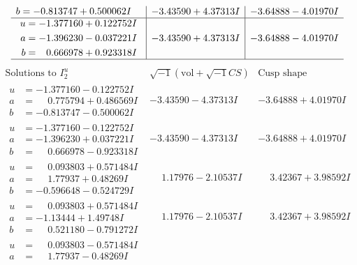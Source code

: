 \documentclass[1p]{elsarticle_modified}
\theoremstyle{definition}
\newcommand{\I}{\sqrt{-1}}
\begin{document}
$$\begin{array}{c|c|c}
\begin{aligned}
b &= -0.813747 + 0.500062 I\end{aligned}
 & -3.43590 + 4.37313 I & -3.64888 - 4.01970 I \\ \hline\begin{aligned}
u &= -1.377160 + 0.122752 I \\
a &= -1.396230 - 0.037221 I \\
b &= \phantom{-}0.666978 + 0.923318 I\end{aligned}
 & -3.43590 + 4.37313 I & -3.64888 - 4.01970 I\\
 \hline 
 \end{array}$$\newpage$$\begin{array}{c|c|c}  
\text{Solutions to }I^u_{2}& \I (\text{vol} + \sqrt{-1}CS) & \text{Cusp shape}\\
 \hline 
\begin{aligned}
u &= -1.377160 - 0.122752 I \\
a &= \phantom{-}0.775794 + 0.486569 I \\
b &= -0.813747 - 0.500062 I\end{aligned}
 & -3.43590 - 4.37313 I & -3.64888 + 4.01970 I \\ \hline\begin{aligned}
u &= -1.377160 - 0.122752 I \\
a &= -1.396230 + 0.037221 I \\
b &= \phantom{-}0.666978 - 0.923318 I\end{aligned}
 & -3.43590 - 4.37313 I & -3.64888 + 4.01970 I \\ \hline\begin{aligned}
u &= \phantom{-}0.093803 + 0.571484 I \\
a &= \phantom{-}1.77937 + 0.48269 I \\
b &= -0.596648 - 0.524729 I\end{aligned}
 & \phantom{-}1.17976 - 2.10537 I & \phantom{-}3.42367 + 3.98592 I \\ \hline\begin{aligned}
u &= \phantom{-}0.093803 + 0.571484 I \\
a &= -1.13444 + 1.49748 I \\
b &= \phantom{-}0.521180 - 0.791272 I\end{aligned}
 & \phantom{-}1.17976 - 2.10537 I & \phantom{-}3.42367 + 3.98592 I \\ \hline\begin{aligned}
u &= \phantom{-}0.093803 - 0.571484 I \\
a &= \phantom{-}1.77937 - 0.48269 I \\

\end{aligned}
\end{array}$$
\end{document}
